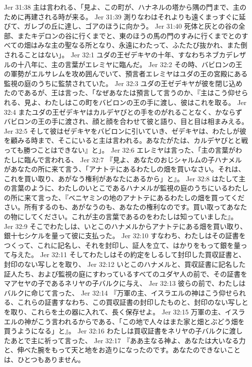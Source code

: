 Jer 31:38  主は言われる、「見よ、この町が、ハナネルの塔から隅の門まで、主のために再建される時が来る。
Jer 31:39  測りなわはそれよりも遠くまっすぐに延びて、ガレブの丘に達し、ゴアのほうに向かう。
Jer 31:40  死体と灰との谷の全部、またキデロンの谷に行くまでと、東のほうの馬の門のすみに行くまでとのすべての畑はみな主の聖なる所となり、永遠にわたって、ふたたび抜かれ、また倒されることはない」。
Jer 32:1  ユダの王ゼデキヤの十年、すなわちネブカデレザルの十八年に、主の言葉がエレミヤに臨んだ。
Jer 32:2  その時、バビロンの王の軍勢がエルサレムを攻め囲んでいて、預言者エレミヤはユダの王の宮殿にある監視の庭のうちに監禁されていた。
Jer 32:3  ユダの王ゼデキヤが彼を閉じ込めたのであるが、王は言った、「なぜあなたは預言して言うのか、『主はこう仰せられる、見よ、わたしはこの町をバビロンの王の手に渡し、彼はこれを取る。
Jer 32:4  またユダの王ゼデキヤはカルデヤびとの手をのがれることなく、かならずバビロンの王の手に渡され、顔と顔を合わせて彼と語り、目と目は相まみえる。
Jer 32:5  そして彼はゼデキヤをバビロンに引いていき、ゼデキヤは、わたしが彼を顧みる時まで、そこにいると主は言われる。あなたがたは、カルデヤびとと戦っても勝つことはできない』と」。
Jer 32:6  エレミヤは言った、「主の言葉がわたしに臨んで言われる、
Jer 32:7  『見よ、あなたのおじシャルムの子ハナメルがあなたの所に来て言う、「アナトテにあるわたしの畑を買いなさい。それは、これを買い取り、あがなう権利があなたにあるから」と』。
Jer 32:8  はたして主の言葉のように、わたしのいとこであるハナメルが監視の庭のうちにいるわたしの所に来て言った、『ベニヤミンの地のアナトテにあるわたしの畑を買ってください。所有するのも、あがなうのも、あなたの権利なのです。買い取ってあなたの物にしてください。これが主の言葉であるのをわたしは知っていました』。
Jer 32:9  そこでわたしは、いとこのハナメルからアナトテにある畑を買い取り、銀十七シケルを量って彼に支払った。
Jer 32:10  すなわち、わたしはその証書をつくって、これに記名し、それを封印し、証人を立て、はかりをもって銀を量って与えた。
Jer 32:11  そしてわたしはその約定をしるして封印した買収証書と、封印のない写しとを取り、
Jer 32:12  いとこのハナメルと、買収証書に記名した証人たち、および監視の庭にすわっているすべてのユダヤ人の前で、その証書をマアセヤの子であるネリヤの子バルクに与え、
Jer 32:13  彼らの前で、わたしはバルクに命じて言った、
Jer 32:14  『万軍の主、イスラエルの神はこう仰せられる、これらの証書すなわち、この買収証書の封印したものと、封印のない写しとを取り、これらを土の器に入れて、長く保存せよ。
Jer 32:15  万軍の主、イスラエルの神がこう言われるからである、「この地で人々はまた家と畑とぶどう畑を買うようになる」と』。
Jer 32:16  わたしは買収証書をネリヤの子バルクに渡したあとで主に祈って言った、
Jer 32:17  『ああ主なる神よ、あなたは大いなる力と、伸べた腕をもって天と地をお造りになったのです。あなたのできないことは、ひとつもありません。
